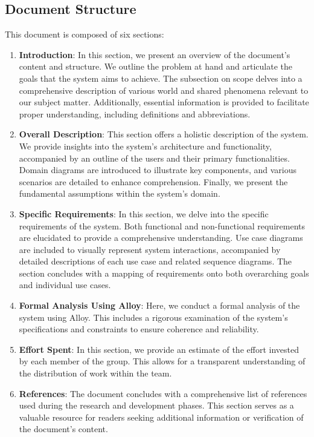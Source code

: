 \subsection{Document Structure}
This document is composed of six sections:
\begin{enumerate}
    \item \textbf{Introduction}: In this section, we present an overview of the document's content and structure. We outline the problem at hand and articulate the goals that the system aims to achieve. The subsection on scope delves into a comprehensive description of various world and shared phenomena relevant to our subject matter. Additionally, essential information is provided to facilitate proper understanding, including definitions and abbreviations.
    \item  \textbf{Overall Description}: This section offers a holistic description of the system. We provide insights into the system's architecture and functionality, accompanied by an outline of the users and their primary functionalities. Domain diagrams are introduced to illustrate key components, and various scenarios are detailed to enhance comprehension. Finally, we present the fundamental assumptions within the system's domain.
    \item  \textbf{Specific Requirements}: In this section, we delve into the specific requirements of the system. Both functional and non-functional requirements are elucidated to provide a comprehensive understanding. Use case diagrams are included to visually represent system interactions, accompanied by detailed descriptions of each use case and related sequence diagrams. The section concludes with a mapping of requirements onto both overarching goals and individual use cases.
    \item \textbf{Formal Analysis Using Alloy}:  Here, we conduct a formal analysis of the system using Alloy. This includes a rigorous examination of the system's specifications and constraints to ensure coherence and reliability.
    \item \textbf{Effort Spent}: In this section, we provide an estimate of the effort invested by each member of the group. This allows for a transparent understanding of the distribution of work within the team.
    \item  \textbf{References}: The document concludes with a comprehensive list of references used during the research and development phases. This section serves as a valuable resource for readers seeking additional information or verification of the document's content.
\end{enumerate}
